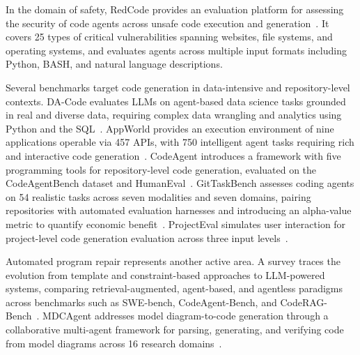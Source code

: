 \documentclass[
english,                 %
bibtex,                  %
]{kththesis}
\numberwithin{listing}{chapter}
\begin{document}
In the domain of safety, RedCode provides an evaluation platform for assessing the security of code agents across unsafe code execution and generation~\cite{guo_redcode_2024}. It covers 25 types of critical vulnerabilities spanning websites, file systems, and operating systems, and evaluates agents across multiple input formats including Python, \gls{BASH}, and natural language descriptions.

Several benchmarks target code generation in data-intensive and repository-level contexts. \gls{DA}-Code evaluates \glspl{LLM} on agent-based data science tasks grounded in real and diverse data, requiring complex data wrangling and analytics using Python and the \gls{SQL}~\cite{huang_da-code_2024}. \Gls{AppWorld} provides an execution environment of nine applications operable via 457 \glspl{API}, with 750 intelligent agent tasks requiring rich and interactive code generation~\cite{trivedi_appworld_2024}. CodeAgent introduces a framework with five programming tools for repository-level code generation, evaluated on the CodeAgent\Gls{Bench} dataset and HumanEval~\cite{zhang_codeagent_2024}. GitTask\Gls{Bench} assesses coding agents on 54 realistic tasks across seven modalities and seven domains, pairing repositories with automated evaluation harnesses and introducing an alpha-value metric to quantify economic benefit~\cite{ni_gittaskbench_2026}. ProjectEval simulates user interaction for project-level code generation evaluation across three input levels~\cite{liu_projecteval_2025}.

Automated program repair represents another active area. A survey traces the evolution from template and constraint-based approaches to \gls{LLM}-powered systems, comparing retrieval-augmented, agent-based, and agentless paradigms across benchmarks such as \gls{SWE}-bench, CodeAgent-Bench, and Code\Gls{RAG}-Bench~\cite{puvvadi_coding_2025}. \gls{MDC}Agent addresses model diagram-to-code generation through a collaborative multi-agent framework for parsing, generating, and verifying code from model diagrams across 16 research domains~\cite{wang_model_2025}.
\end{document}
